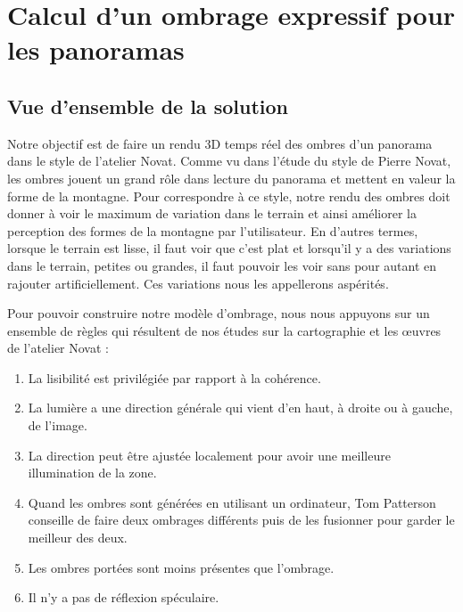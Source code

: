 \chapter{Calcul d'un ombrage expressif pour les panoramas}

\section{Vue d'ensemble de la solution}

Notre objectif est de faire un rendu 3D temps réel des ombres d'un panorama dans le style de l'atelier Novat. Comme vu dans l'étude du style de Pierre Novat, les ombres jouent un grand rôle dans lecture du panorama et mettent en valeur la forme de la montagne. Pour correspondre à ce style, notre rendu des ombres doit donner à voir le maximum de variation dans le terrain et ainsi améliorer la perception des formes de la montagne par l'utilisateur. En d'autres termes, lorsque le terrain est lisse, il faut voir que c'est plat et lorsqu'il y a des variations dans le terrain, petites ou grandes, il faut pouvoir les voir sans pour autant en rajouter artificiellement. Ces variations nous les appellerons aspérités.


Pour pouvoir construire notre modèle d'ombrage, nous nous appuyons sur un ensemble de règles qui résultent de nos études sur la cartographie et les œuvres de l'atelier Novat :

\begin{enumerate}
\item La lisibilité est privilégiée par rapport à la cohérence. 
\item La lumière a une direction générale qui vient d'en haut, à droite ou à gauche, de l'image. 
\item La direction peut être ajustée localement pour avoir une meilleure illumination de la zone.
\item Quand les ombres sont générées en utilisant un ordinateur, Tom Patterson conseille de faire deux ombrages différents puis de les fusionner pour garder le meilleur des deux. 
\item Les ombres portées sont moins présentes que l'ombrage.
\item Il n'y a pas de réflexion spéculaire.
\end{enumerate}

